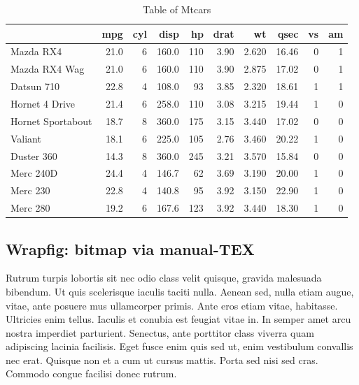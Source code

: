 \documentclass[
  9pt,
  letterpaper,
  DIV=11,
  numbers=noendperiod]{scrartcl}
\begin{document}
\hypertarget{tbl-mtcars2}{}
\begin{table}
\caption{\label{tbl-mtcars2}Table of Mtcars }\tabularnewline

\centering\begingroup\fontsize{7}{9}\selectfont

\begin{tabular}{l|r|r|r|r|r|r|r|r|r}
\hline
  & mpg & cyl & disp & hp & drat & wt & qsec & vs & am\\
\hline
Mazda RX4 & 21.0 & 6 & 160.0 & 110 & 3.90 & 2.620 & 16.46 & 0 & 1\\
\hline
Mazda RX4 Wag & 21.0 & 6 & 160.0 & 110 & 3.90 & 2.875 & 17.02 & 0 & 1\\
\hline
Datsun 710 & 22.8 & 4 & 108.0 & 93 & 3.85 & 2.320 & 18.61 & 1 & 1\\
\hline
Hornet 4 Drive & 21.4 & 6 & 258.0 & 110 & 3.08 & 3.215 & 19.44 & 1 & 0\\
\hline
Hornet Sportabout & 18.7 & 8 & 360.0 & 175 & 3.15 & 3.440 & 17.02 & 0 & 0\\
\hline
Valiant & 18.1 & 6 & 225.0 & 105 & 2.76 & 3.460 & 20.22 & 1 & 0\\
\hline
Duster 360 & 14.3 & 8 & 360.0 & 245 & 3.21 & 3.570 & 15.84 & 0 & 0\\
\hline
Merc 240D & 24.4 & 4 & 146.7 & 62 & 3.69 & 3.190 & 20.00 & 1 & 0\\
\hline
Merc 230 & 22.8 & 4 & 140.8 & 95 & 3.92 & 3.150 & 22.90 & 1 & 0\\
\hline
Merc 280 & 19.2 & 6 & 167.6 & 123 & 3.92 & 3.440 & 18.30 & 1 & 0\\
\hline
\end{tabular}
\endgroup{}
\end{table}

\newpage{}

\hypertarget{wrapfig-bitmap-via-manual-tex}{%
\subsection{Wrapfig: bitmap via
manual-TEX}\label{wrapfig-bitmap-via-manual-tex}}

Rutrum turpis lobortis sit nec odio class velit quisque, gravida
malesuada bibendum. Ut quis scelerisque iaculis taciti nulla. Aenean
sed, nulla etiam augue, vitae, ante posuere mus ullamcorper primis. Ante
eros etiam vitae, habitasse. Ultricies enim tellus. Iaculis et conubia
est feugiat vitae in. In semper amet arcu nostra imperdiet parturient.
Senectus, ante porttitor class viverra quam adipiscing lacinia
facilisis. Eget fusce enim quis sed ut, enim vestibulum convallis nec
erat. Quisque non et a cum ut cursus mattis. Porta sed nisi sed cras.
Commodo congue facilisi donec rutrum.
\end{document}
